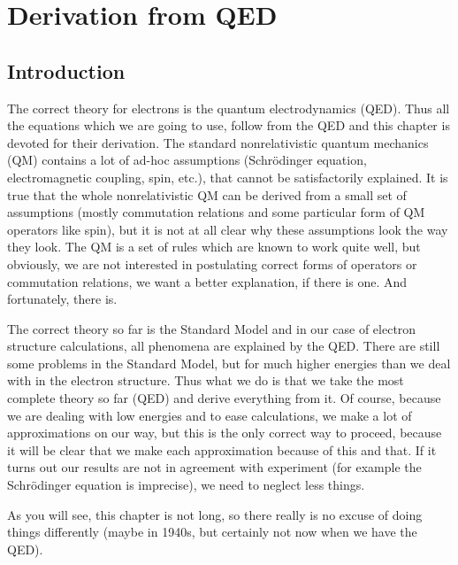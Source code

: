 \chapter{Derivation from QED}

\section{Introduction}

The correct theory for electrons is the quantum electrodynamics (QED). Thus all
the equations which we are going to use, follow from the QED and this chapter
is devoted for their derivation. The standard nonrelativistic quantum
mechanics (QM)
contains a lot of ad-hoc assumptions (Schr\"odinger equation, electromagnetic
coupling, spin, etc.), that cannot be satisfactorily explained. It is true that
the whole nonrelativistic QM can be derived from a small set of
assumptions (mostly commutation relations and some particular form of QM
operators like spin), but it is not at all clear why these assumptions look the
way they look. The QM is a set of rules which are known to work quite
well, but obviously, we are not interested in postulating correct forms of
operators or commutation relations, we want a better explanation, if there is
one. And fortunately, there is.

The correct theory so far is the Standard Model and in our case of electron
structure calculations, all phenomena are explained by the QED. There are still
some problems in the Standard Model, but for much higher energies than
we deal with in the electron structure. Thus what we do is that we take
the most complete theory so far (QED) and derive everything from it. Of course,
because we are dealing with low energies and to ease calculations, we make a
lot of approximations on our way, but this is the only correct way to
proceed, because it will be clear that we make each approximation because of
this and that. If it turns out our results are not in agreement with experiment
(for example the Schr\"odinger equation is imprecise), we need to neglect
less things. 

As you will see, this chapter is not long, so there really is no excuse of
doing things differently (maybe in 1940s, but certainly not now when we have
the QED). 

